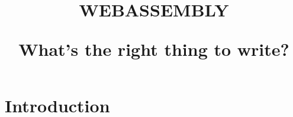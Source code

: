 \documentclass[dvipdfmx,slide,14pt]{beamer}
\title{WEBASSEMBLY

What's the right thing to write?}
\begin{document}
 
\begin{frame}
    \titlepage
\end{frame}

\section{Introduction}


\begin{frame}
    \tableofcontents
\end{frame}










\end{document}
